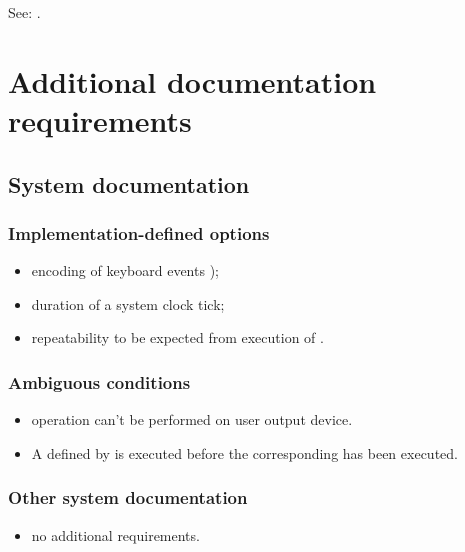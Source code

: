 See: .


\section{Additional documentation requirements} %

\subsection{System documentation} %

\subsubsection{Implementation-defined options} %

\begin{itemize}
\item encoding of keyboard events );
\item duration of a system clock tick;
\item repeatability to be expected from execution of
	.
\end{itemize}

\subsubsection{Ambiguous conditions} %

\begin{itemize}
\item {} operation can't be performed on
	user output device.

\item A  defined by
	is executed before the corresponding \linebreak
	has been executed.
\end{itemize}

\subsubsection{Other system documentation} %

\begin{itemize}
\item no additional requirements.
\end{itemize}

